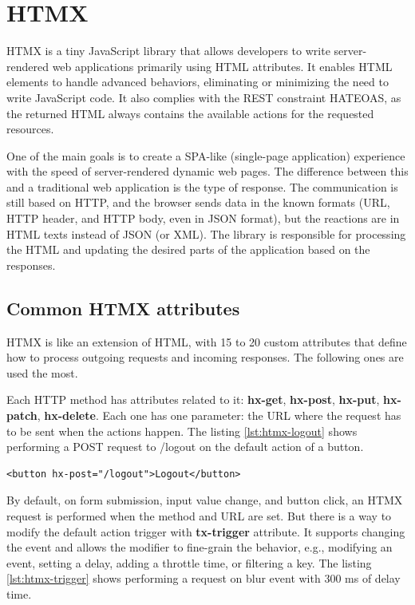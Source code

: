 \section{HTMX}

HTMX is a tiny JavaScript library that allows developers to write server-rendered web applications primarily using HTML attributes. It enables HTML elements to handle advanced behaviors, eliminating or minimizing the need to write JavaScript code. It also complies with the REST constraint HATEOAS, as the returned HTML always contains the available actions for the requested resources.

One of the main goals is to create a SPA-like (single-page application) experience with the speed of server-rendered dynamic web pages. The difference between this and a traditional web application is the type of response. The communication is still based on HTTP, and the browser sends data in the known formats (URL, HTTP header, and HTTP body, even in JSON format), but the reactions are in HTML texts instead of JSON (or XML). The library is responsible for processing the HTML and updating the desired parts of the application based on the responses.

\subsection{Common HTMX attributes}

HTMX is like an extension of HTML, with 15 to 20 custom attributes that define how to process outgoing requests and incoming responses. The following ones are used the most.

Each HTTP method has attributes related to it: \textbf{hx-get}, \textbf{hx-post}, \textbf{hx-put}, \textbf{hx-patch}, \textbf{hx-delete}. Each one has one parameter: the URL where the request has to be sent when the actions happen. The listing \ref{lst:htmx-logout} shows performing a POST request to /logout on the default action of a button.

\begin{lstlisting}[caption=Preforming an \textbf{hx-post} request,label=lst:htmx-logout, float]
<button hx-post="/logout">Logout</button>
\end{lstlisting}

By default, on form submission, input value change, and button click, an HTMX request is performed when the method and URL are set. But there is a way to modify the default action trigger with \textbf{tx-trigger} attribute. It supports changing the event and allows the modifier to fine-grain the behavior, e.g., modifying an event, setting a delay, adding a throttle time, or filtering a key. The listing \ref{lst:htmx-trigger} shows performing a request on blur event with 300 ms of delay time.

